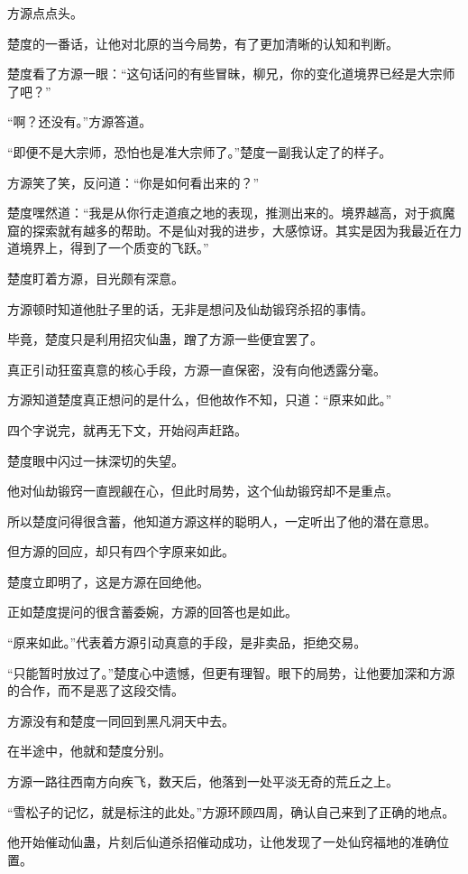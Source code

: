 \begin{this_body}
方源点点头。

楚度的一番话，让他对北原的当今局势，有了更加清晰的认知和判断。

楚度看了方源一眼：“这句话问的有些冒昧，柳兄，你的变化道境界已经是大宗师了吧？”

“啊？还没有。”方源答道。

“即便不是大宗师，恐怕也是准大宗师了。”楚度一副我认定了的样子。

方源笑了笑，反问道：“你是如何看出来的？”

楚度嘿然道：“我是从你行走道痕之地的表现，推测出来的。境界越高，对于疯魔窟的探索就有越多的帮助。不是仙对我的进步，大感惊讶。其实是因为我最近在力道境界上，得到了一个质变的飞跃。”

楚度盯着方源，目光颇有深意。

方源顿时知道他肚子里的话，无非是想问及仙劫锻窍杀招的事情。

毕竟，楚度只是利用招灾仙蛊，蹭了方源一些便宜罢了。

真正引动狂蛮真意的核心手段，方源一直保密，没有向他透露分毫。

方源知道楚度真正想问的是什么，但他故作不知，只道：“原来如此。”

四个字说完，就再无下文，开始闷声赶路。

楚度眼中闪过一抹深切的失望。

他对仙劫锻窍一直觊觎在心，但此时局势，这个仙劫锻窍却不是重点。

所以楚度问得很含蓄，他知道方源这样的聪明人，一定听出了他的潜在意思。

但方源的回应，却只有四个字原来如此。

楚度立即明了，这是方源在回绝他。

正如楚度提问的很含蓄委婉，方源的回答也是如此。

“原来如此。”代表着方源引动真意的手段，是非卖品，拒绝交易。

“只能暂时放过了。”楚度心中遗憾，但更有理智。眼下的局势，让他要加深和方源的合作，而不是恶了这段交情。

方源没有和楚度一同回到黑凡洞天中去。

在半途中，他就和楚度分别。

方源一路往西南方向疾飞，数天后，他落到一处平淡无奇的荒丘之上。

“雪松子的记忆，就是标注的此处。”方源环顾四周，确认自己来到了正确的地点。

他开始催动仙蛊，片刻后仙道杀招催动成功，让他发现了一处仙窍福地的准确位置。


\end{this_body}
